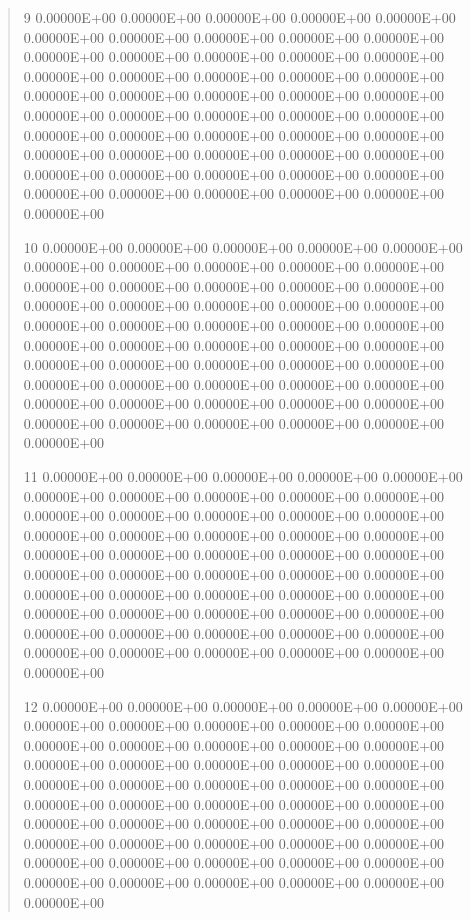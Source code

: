\documentclass[letterpaper,10pt,english]{sphinxmanual}
\begin{document}
\begin{quote}
\begin{DUlineblock}{0em}
\begin{DUlineblock}{\DUlineblockindent}
\item[] 9   0.00000E+00  0.00000E+00  0.00000E+00  0.00000E+00  0.00000E+00  0.00000E+00  0.00000E+00  0.00000E+00  0.00000E+00  0.00000E+00  0.00000E+00  0.00000E+00  0.00000E+00  0.00000E+00  0.00000E+00  0.00000E+00  0.00000E+00  0.00000E+00  0.00000E+00  0.00000E+00  0.00000E+00  0.00000E+00  0.00000E+00  0.00000E+00  0.00000E+00  0.00000E+00  0.00000E+00  0.00000E+00  0.00000E+00  0.00000E+00  0.00000E+00  0.00000E+00  0.00000E+00  0.00000E+00  0.00000E+00  0.00000E+00  0.00000E+00  0.00000E+00  0.00000E+00  0.00000E+00  0.00000E+00  0.00000E+00  0.00000E+00  0.00000E+00  0.00000E+00  0.00000E+00  0.00000E+00  0.00000E+00  0.00000E+00  0.00000E+00  0.00000E+00
\end{DUlineblock}
\item[] 10   0.00000E+00  0.00000E+00  0.00000E+00  0.00000E+00  0.00000E+00  0.00000E+00  0.00000E+00  0.00000E+00  0.00000E+00  0.00000E+00  0.00000E+00  0.00000E+00  0.00000E+00  0.00000E+00  0.00000E+00  0.00000E+00  0.00000E+00  0.00000E+00  0.00000E+00  0.00000E+00  0.00000E+00  0.00000E+00  0.00000E+00  0.00000E+00  0.00000E+00  0.00000E+00  0.00000E+00  0.00000E+00  0.00000E+00  0.00000E+00  0.00000E+00  0.00000E+00  0.00000E+00  0.00000E+00  0.00000E+00  0.00000E+00  0.00000E+00  0.00000E+00  0.00000E+00  0.00000E+00  0.00000E+00  0.00000E+00  0.00000E+00  0.00000E+00  0.00000E+00  0.00000E+00  0.00000E+00  0.00000E+00  0.00000E+00  0.00000E+00  0.00000E+00
\item[] 11   0.00000E+00  0.00000E+00  0.00000E+00  0.00000E+00  0.00000E+00  0.00000E+00  0.00000E+00  0.00000E+00  0.00000E+00  0.00000E+00  0.00000E+00  0.00000E+00  0.00000E+00  0.00000E+00  0.00000E+00  0.00000E+00  0.00000E+00  0.00000E+00  0.00000E+00  0.00000E+00  0.00000E+00  0.00000E+00  0.00000E+00  0.00000E+00  0.00000E+00  0.00000E+00  0.00000E+00  0.00000E+00  0.00000E+00  0.00000E+00  0.00000E+00  0.00000E+00  0.00000E+00  0.00000E+00  0.00000E+00  0.00000E+00  0.00000E+00  0.00000E+00  0.00000E+00  0.00000E+00  0.00000E+00  0.00000E+00  0.00000E+00  0.00000E+00  0.00000E+00  0.00000E+00  0.00000E+00  0.00000E+00  0.00000E+00  0.00000E+00  0.00000E+00
\item[] 12   0.00000E+00  0.00000E+00  0.00000E+00  0.00000E+00  0.00000E+00  0.00000E+00  0.00000E+00  0.00000E+00  0.00000E+00  0.00000E+00  0.00000E+00  0.00000E+00  0.00000E+00  0.00000E+00  0.00000E+00  0.00000E+00  0.00000E+00  0.00000E+00  0.00000E+00  0.00000E+00  0.00000E+00  0.00000E+00  0.00000E+00  0.00000E+00  0.00000E+00  0.00000E+00  0.00000E+00  0.00000E+00  0.00000E+00  0.00000E+00  0.00000E+00  0.00000E+00  0.00000E+00  0.00000E+00  0.00000E+00  0.00000E+00  0.00000E+00  0.00000E+00  0.00000E+00  0.00000E+00  0.00000E+00  0.00000E+00  0.00000E+00  0.00000E+00  0.00000E+00  0.00000E+00  0.00000E+00  0.00000E+00  0.00000E+00  0.00000E+00  0.00000E+00

\end{DUlineblock}
\end{quote}
\end{document}
